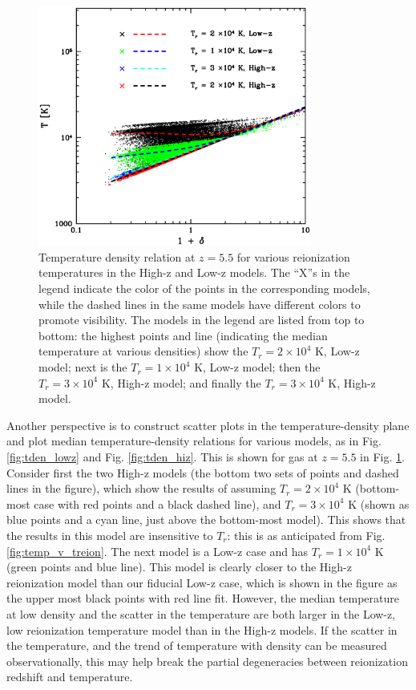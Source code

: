 \begin{figure}
\bc
\includegraphics[width=9cm]{f9.eps}
\caption{Temperature density relation at $z=5.5$ for various reionization temperatures in the High-z and Low-z models. The ``X''s in the 
legend indicate the color of the points in the corresponding models, while the dashed lines in the same models have different colors to
promote visibility. The models in the legend are listed from top to bottom: the highest points and line (indicating the median temperature
at various densities) show the $T_r = 2 \times 10^4$ K, Low-z model; next is the $T_r = 1 \times 10^4$ K, Low-z model;
then the $T_r = 3 \times 10^4$ K, High-z model; and finally the $T_r = 3 \times 10^4$ K, High-z model.
}
\label{fig:tden_v_treion}
\ec
\end{figure}

Another perspective is to construct scatter plots in the temperature-density plane and plot median temperature-density relations for various models, as in Fig. \ref{fig:tden_lowz} and Fig. \ref{fig:tden_hiz}. This is shown for gas at $z=5.5$ in Fig. \ref{fig:tden_v_treion}. Consider first the two High-z models (the bottom two sets of points and dashed lines in the figure), which show the results of assuming $T_r = 2 \times 10^4$ K (bottom-most case with red points and a black dashed line), and $T_r = 3 \times 10^4$ K (shown as blue points and a cyan line, just above the bottom-most model). This shows that the results in this model are insensitive to $T_r$: this is as anticipated from
Fig. \ref{fig:temp_v_treion}. The next model is a Low-z case and has $T_r = 1 \times 10^4$ K (green points and blue line). This
model is clearly closer to the High-z reionization model than our fiducial Low-z case, which is shown in the figure as the upper most
black points with red line fit. However, the median temperature at low density and the scatter in the temperature 
are both larger in the Low-z, low reionization
temperature model than in the High-z models. If the scatter in the temperature, and the trend of temperature with density can be measured
observationally, this may help break the partial degeneracies between reionization redshift and temperature. 




